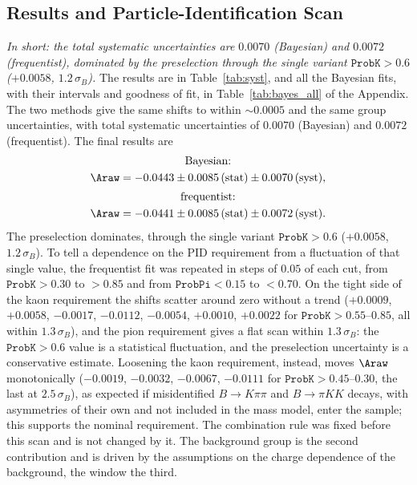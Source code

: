 \subsection{Results and Particle-Identification Scan}
\emph{In short: the total systematic uncertainties are $0.0070$ (Bayesian) and $0.0072$ (frequentist), dominated by the preselection through the single variant $\texttt{ProbK}>0.6$ ($+0.0058$, $1.2\,\sigma_B$).}
The results are in Table~\ref{tab:syst}, and all the Bayesian fits, with their intervals and goodness of fit, in Table~\ref{tab:bayes_all} of the Appendix. The two methods give the same shifts to within $\sim$$0.0005$ and the same group uncertainties, with total systematic uncertainties of $0.0070$ (Bayesian) and $0.0072$ (frequentist). The final results are
\begin{gather*}
\text{Bayesian:}\\ \Araw=-0.0443\pm0.0085\,(\text{stat})\pm0.0070\,(\text{syst}),\\[2pt]
\text{frequentist:}\\ \Araw=-0.0441\pm0.0085\,(\text{stat})\pm0.0072\,(\text{syst}).
\end{gather*}
The preselection dominates, through the single variant $\texttt{ProbK}>0.6$ ($+0.0058$, $1.2\,\sigma_B$). To tell a dependence on the PID requirement from a fluctuation of that single value, the frequentist fit was repeated in steps of $0.05$ of each cut, from $\texttt{ProbK}>0.30$ to $>0.85$ and from $\texttt{ProbPi}<0.15$ to $<0.70$. On the tight side of the kaon requirement the shifts scatter around zero without a trend ($+0.0009$, $+0.0058$, $-0.0017$, $-0.0112$, $-0.0054$, $+0.0010$, $+0.0022$ for $\texttt{ProbK}>0.55$--$0.85$, all within $1.3\,\sigma_B$), and the pion requirement gives a flat scan within $1.3\,\sigma_B$: the $\texttt{ProbK}>0.6$ value is a statistical fluctuation, and the preselection uncertainty is a conservative estimate. Loosening the kaon requirement, instead, moves $\Araw$ monotonically ($-0.0019$, $-0.0032$, $-0.0067$, $-0.0111$ for $\texttt{ProbK}>0.45$--$0.30$, the last at $2.5\,\sigma_B$), as expected if misidentified $B\to K\pi\pi$ and $B\to\pi KK$ decays, with asymmetries of their own and not included in the mass model, enter the sample; this supports the nominal requirement. The combination rule was fixed before this scan and is not changed by it. The background group is the second contribution and is driven by the assumptions on the charge dependence of the background, the window the third.

